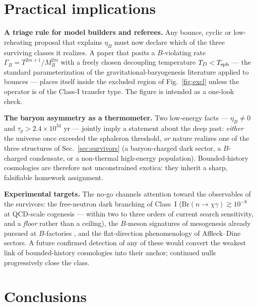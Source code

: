 \documentclass[12pt,a4paper]{article}
\begin{document}
\section{Practical implications}
\label{sec:practice}

\noindent\textbf{A triage rule for model builders and referees.}
Any bounce, cyclic or low-reheating proposal that explains $\eta_{B}$
must now declare which of the three surviving classes it realizes.  A
paper that posits a $B$-violating rate
$\Gamma_{B}=T^{2m+1}/M_{B}^{2m}$ with a freely chosen decoupling
temperature $T_{D}<T_{\rm sph}$ --- the standard parameterization of the
gravitational-baryogenesis literature applied to bounces
\cite{QuantumBounce,BigBounce} --- places itself inside the excluded
region of Fig.~\ref{fig:excl} unless the operator is of the
Class-I transfer type.  The figure is intended as a one-look check.

\medskip
\noindent\textbf{The baryon asymmetry as a thermometer.}
Two low-energy facts --- $\eta_{B}\neq0$ and $\tau_{p}>2.4\times10^{34}$
yr --- jointly imply a statement about the deep past: \emph{either} the
universe once exceeded the sphaleron threshold, \emph{or} nature
realizes one of the three structures of Sec.~\ref{sec:survivors} (a
baryon-charged dark sector, a $B$-charged condensate, or a non-thermal
high-energy population).  Bounded-history cosmologies are therefore not
unconstrained exotica: they inherit a sharp, falsifiable homework
assignment.

\medskip
\noindent\textbf{Experimental targets.}
The no-go channels attention toward the observables of the survivors:
the free-neutron dark branching of Class~I
($\mathrm{Br}(n\to\chi\gamma)\gtrsim10^{-8}$ at QCD-scale cogenesis ---
within two to three orders of current search sensitivity, and a
\emph{floor} rather than a ceiling), the $B$-meson signatures of
mesogenesis already pursued at $B$-factories
\cite{MesogenesisCollider}, and the flat-direction phenomenology of
Affleck--Dine sectors.  A future confirmed detection of any of these
would convert the weakest link of bounded-history cosmologies into
their anchor; continued nulls progressively close the class.

\section{Conclusions}
\label{sec:conclusions}
\end{document}
